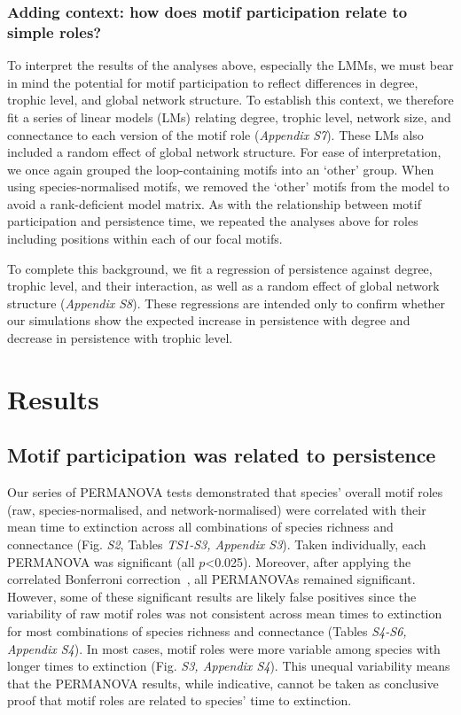 \documentclass[12pt]{article}
\begin{document}
\begin{spacing}{1.0}
        \subsubsection*{Adding context: how does motif participation relate to simple roles?}

            To interpret the results of the analyses above, especially the LMMs, we must bear in mind the potential for motif participation to reflect differences in degree, trophic level, and global network structure. 
            To establish this context, we therefore fit a series of linear models (LMs) relating degree, trophic level, network size, and connectance to each version of the motif role (\emph{Appendix S7}). 
            These LMs also included a random effect of global network structure.
            For ease of interpretation, we once again grouped the loop-containing motifs into an `other' group. 
            When using species-normalised motifs, we removed the `other' motifs from the model to avoid a rank-deficient model matrix.
            As with the relationship between motif participation and persistence time, we repeated the analyses above for roles including positions within each of our focal motifs.
            
            
            To complete this background, we fit a regression of persistence against degree, trophic level, and their interaction, as well as a random effect of global network structure (\emph{Appendix S8}). 
            These regressions are intended only to confirm whether our simulations show the expected increase in persistence with degree and decrease in persistence with trophic level. 


\section*{Results}
	
    \subsection*{Motif participation was related to persistence}
    
		Our series of PERMANOVA tests demonstrated that species' overall motif roles (raw, species-normalised, and network-normalised) were correlated with their mean time to extinction across all combinations of species richness and connectance (Fig. \emph{S2}, Tables \emph{TS1-S3, Appendix S3}). 
        Taken individually, each PERMANOVA was significant (all $p$\textless0.025). Moreover, after applying the correlated Bonferroni correction~\citep{Drezner2016}, all PERMANOVAs remained significant.
		However, some of these significant results are likely false positives since the variability of raw motif roles was not consistent across mean times to extinction for most combinations of species richness and connectance (Tables \emph{S4-S6, Appendix S4}). 
        In most cases, motif roles were more variable among species with longer times to extinction (Fig. \emph{S3, Appendix S4}).
        This unequal variability means that the PERMANOVA results, while indicative, cannot be taken as conclusive proof that motif roles are related to species' time to extinction.
    


\end{spacing}
\end{document}

